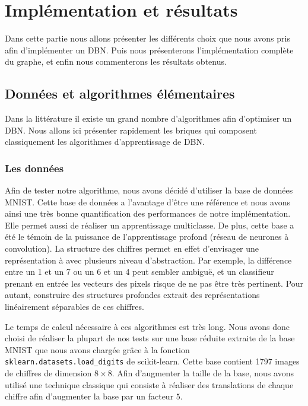 \documentclass[10pt,a4paper]{article}
\begin{document}
\section{Implémentation et résultats}


Dans cette partie nous allons présenter les différents choix que nous avons pris afin d'implémenter un DBN. Puis nous présenterons l'implémentation complète du graphe, et enfin nous commenterons les résultats obtenus.


\subsection{Données et algorithmes élémentaires}


Dans la littérature il existe un grand nombre d'algorithmes afin d'optimiser un DBN. Nous allons ici présenter rapidement les briques qui composent classiquement les algorithmes d'apprentissage de DBN.


\subsubsection{Les données}

Afin de tester notre algorithme, nous avons décidé d'utiliser la base de données MNIST. Cette base de données a l'avantage d'être une référence et nous avons ainsi une très bonne quantification des performances de notre implémentation. Elle permet aussi de réaliser un apprentissage multiclasse. De plus, cette base a été le témoin de la puissance de l'apprentissage profond (réseau de neurones à convolution). La structure des chiffres permet en effet d'envisager une représentation à avec plusieurs niveau d'abstraction. Par exemple, la différence entre un 1 et un 7 ou un 6 et un 4 peut sembler ambiguë, et un classifieur prenant en entrée les vecteurs des pixels risque de ne pas être très pertinent. Pour autant, construire des structures profondes extrait des représentations linéairement séparables de ces chiffres.


Le temps de calcul nécessaire à ces algorithmes est très long. Nous avons donc choisi de réaliser la plupart de nos tests sur une base réduite extraite de la base MNIST que nous avons chargée grâce à la fonction \texttt{sklearn.datasets.load\_digits} de scikit-learn. Cette base contient 1797 images de chiffres de dimension $8 \times 8$. Afin d'augmenter la taille de la base, nous avons utilisé une technique classique qui consiste à réaliser des translations de chaque chiffre afin d'augmenter la base par un facteur $5$.
\end{document}
